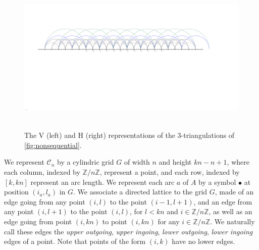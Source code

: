 \documentclass{amsart}
\theoremstyle{remark}
\newcommand{\Z}{\mathbb{Z}} %
\newcommand{\cylinder}{\mathcal{C}}
\begin{document}
\begin{figure}[b]
	\mbox{\includegraphics[page=7, scale=.5, clip, trim=21.2cm 0cm 24cm 6cm]{FNSk3p2} \quad {}}
	\caption{The V (left) and H (right) representations of the $3$-triangulations of \cref{fig:nonsequential}.}
	\label{fig:nonsequentialVHrep}
\end{figure}

We represent $\cylinder_n$ by a cylindric grid $G$ of width $n$ and height $kn-n+1$, where each column, indexed by $\Z/n\Z$, represent a point, and each row, indexed by $[k,kn]$ represent an arc length.
We represent each arc $a$ of $A$ by a symbol $\bullet$ at position $(i_a,l_a)$ in $G$.
We associate a directed lattice to the grid $G$, made of an edge going from any point $(i,l)$ to the point $(i-1,l+1)$, and an edge from any point $(i,l+1)$ to the point $(i,l)$, for $l<kn$ and $i \in \Z/n\Z$, as well as an edge going from point $(i,kn)$ to point $(i,kn)$ for any $i \in \Z/n\Z$.
We naturally call these edges the \emph{upper outgoing}, \emph{upper ingoing}, \emph{lower outgoing}, \emph{lower ingoing} edges of a point. Note that points of the form $(i,k)$ have no lower edges.
\end{document}
